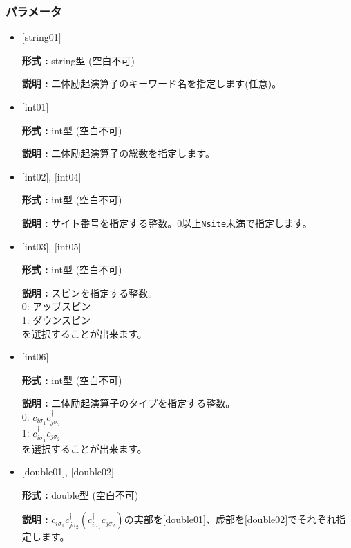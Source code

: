 \subsubsection{パラメータ}
 \begin{itemize}

   \item  $[$string01$]$
   
    {\bf 形式 :} string型 (空白不可)

   {\bf 説明 :} 二体励起演算子のキーワード名を指定します(任意)。

   \item  $[$int01$]$
   
    {\bf 形式 :} int型 (空白不可)

   {\bf 説明 :} 二体励起演算子の総数を指定します。

  \item  $[$int02$]$, $[$int04$]$

 {\bf 形式 :} int型 (空白不可)

{\bf 説明 :} サイト番号を指定する整数。0以上\verb|Nsite|{未満}で指定します。
 
  \item  $[$int03$]$, $[$int05$]$

 {\bf 形式 :} int型 (空白不可)

{\bf 説明 :} スピンを指定する整数。\\
0: アップスピン\\
1: ダウンスピン\\
を選択することが出来ます。

\item  $[$int06$]$

 {\bf 形式 :} int型 (空白不可)

{\bf 説明 :} 二体励起演算子のタイプを指定する整数。\\
0: $ c_{i\sigma_1}c_{j\sigma_2}^{\dagger}$\\
1: $ c_{i\sigma_1}^{\dagger}c_{j\sigma_2}$\\
を選択することが出来ます。

\item  $[$double01$]$, $[$double02$]$

 {\bf 形式 :} double型 (空白不可)

{\bf 説明 :} $ c_{i\sigma_1}c_{j\sigma_2}^{\dagger} ( c_{i\sigma_1}^{\dagger}c_{j\sigma_2})$の実部を$[$double01$]$、虚部を$[$double02$]$でそれぞれ指定します。

\end{itemize}


